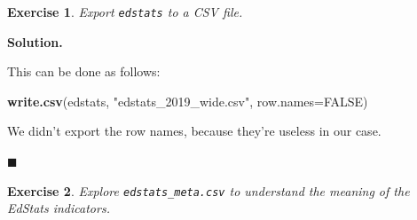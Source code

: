 \documentclass[10pt,b5paper,krantz1]{krantz}
\newenvironment{Shaded}{\begin{snugshade}}{\end{snugshade}}
\newcommand{\DataTypeTok}[1]{\textcolor[rgb]{0.27,0.27,0.27}{#1}}
\newcommand{\KeywordTok}[1]{\textcolor[rgb]{0.27,0.27,0.27}{\textbf{#1}}}
\newcommand{\NormalTok}[1]{#1}
\newcommand{\OtherTok}[1]{\textcolor[rgb]{0.37,0.37,0.37}{#1}}
\newcommand{\StringTok}[1]{\textcolor[rgb]{0.5,0.5,0.5}{#1}}
\newtheorem{exercise}{Exercise}[chapter]
\newenvironment{solution}{%
\bigskip\noindent\textbf{Solution. }%
\it\ignorespaces%
\ignorespaces%
}{\ignorespaces%
\hfill$\blacksquare$%
}
\begin{document}
\begin{exercise}

Export \texttt{edstats} to a CSV file.

\end{exercise}

\begin{solution}

This can be done as follows:

\begin{Shaded}
\begin{Highlighting}[]
\KeywordTok{write.csv}\NormalTok{(edstats, }\StringTok{"edstats_2019_wide.csv"}\NormalTok{, }\DataTypeTok{row.names=}\OtherTok{FALSE}\NormalTok{)}
\end{Highlighting}
\end{Shaded}

We didn't export the row names, because they're useless in our case.

\end{solution}

\begin{exercise}

Explore \texttt{edstats\_meta.csv} to understand the meaning of the
EdStats indicators.

\end{exercise}
\end{document}
